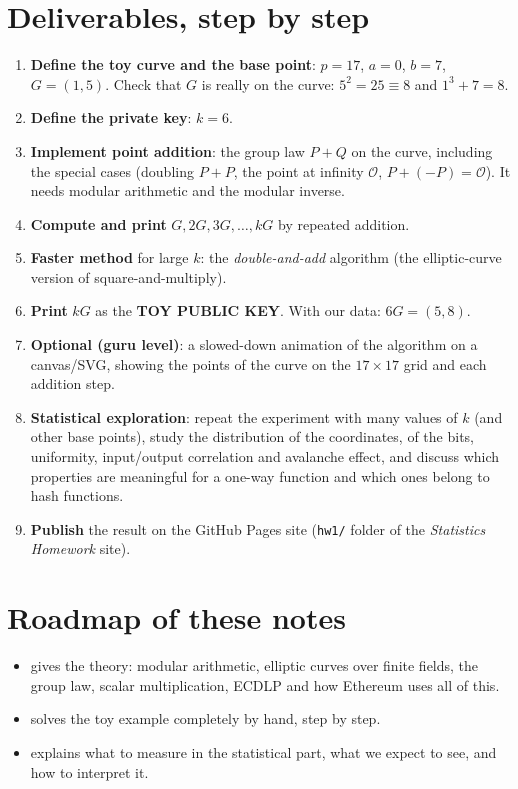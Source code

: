 \section{Deliverables, step by step}

\begin{enumerate}
  \item \textbf{Define the toy curve and the base point}: $p = 17$, $a = 0$, $b = 7$, $G = (1,5)$. Check that $G$ is really on the curve: $5^2 = 25 \equiv 8$ and $1^3 + 7 = 8$. \checkmark
  \item \textbf{Define the private key}: $k = 6$.
  \item \textbf{Implement point addition}: the group law $P + Q$ on the curve, including the special cases (doubling $P + P$, the point at infinity $\mathcal{O}$, $P + (-P) = \mathcal{O}$). It needs modular arithmetic and the modular inverse.
  \item \textbf{Compute and print} $G, 2G, 3G, \ldots, kG$ by repeated addition.
  \item \textbf{Faster method} for large $k$: the \textit{double-and-add} algorithm (the elliptic-curve version of square-and-multiply).
  \item \textbf{Print} $kG$ as the \textbf{TOY PUBLIC KEY}. With our data: $6G = (5,8)$.
  \item \textbf{Optional (guru level)}: a slowed-down animation of the algorithm on a canvas/SVG, showing the points of the curve on the $17 \times 17$ grid and each addition step.
  \item \textbf{Statistical exploration}: repeat the experiment with many values of $k$ (and other base points), study the distribution of the coordinates, of the bits, uniformity, input/output correlation and avalanche effect, and discuss which properties are meaningful for a one-way function and which ones belong to hash functions.
  \item \textbf{Publish} the result on the GitHub Pages site (\texttt{hw1/} folder of the \textit{Statistics Homework} site).
\end{enumerate}

\section{Roadmap of these notes}

\begin{itemize}
  \item {} gives the theory: modular arithmetic, elliptic curves over finite fields, the group law, scalar multiplication, ECDLP and how Ethereum uses all of this.
  \item {} solves the toy example completely by hand, step by step.
  \item {} explains what to measure in the statistical part, what we expect to see, and how to interpret it.
\end{itemize}
